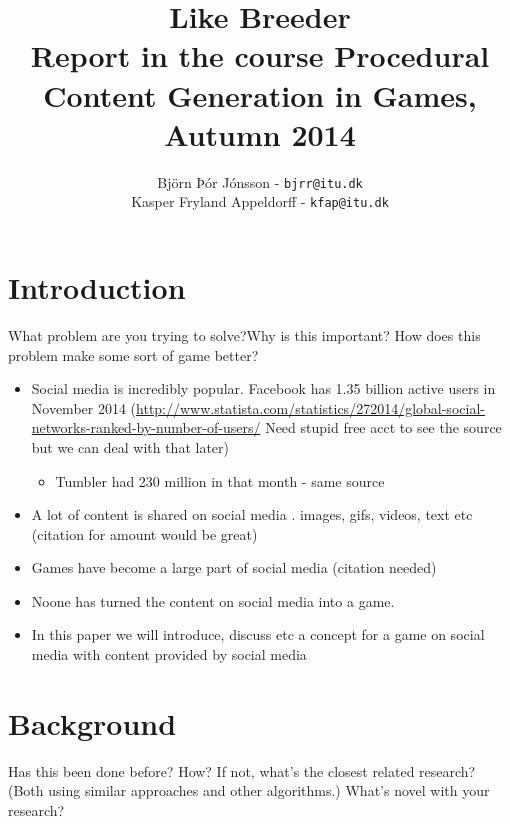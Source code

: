 \documentclass[]{article}
\title{Like Breeder\\ \small Report in the course Procedural Content Generation in Games, Autumn 2014}
\author{Björn Þór Jónsson - \texttt{bjrr@itu.dk}\\Kasper Fryland Appeldorff - \texttt{kfap@itu.dk}}
\begin{document}

\maketitle
\listoftodos %
\newpage
\begin{abstract}
\end{abstract}

\section{Introduction}
\label{sec:Introduction}
\begin{framed}
What problem are you trying to solve?Why is this important? How does this problem make some sort of game better?
\end{framed}

\begin{itemize}
\item Social media is incredibly popular. Facebook has 1.35 billion active users in November 2014 (\url{http://www.statista.com/statistics/272014/global-social-networks-ranked-by-number-of-users/} Need stupid free acct to see the source but we can deal with that later)
	\begin{itemize}
	\item Tumbler had 230 million in that month - same source
	\end{itemize}
\item A lot of content is shared on social media . images, gifs, videos, text etc (citation for amount would be great)
\item Games have become a large part of social media (citation needed)
\item Noone has turned the content on social media into a game.
\item In this paper we will introduce, discuss etc a concept for a game on social media with content provided by social media
\end{itemize}



\section{Background}
\label{sec:Background}

\begin{framed}
Has this been done before? How? If not, what’s the closest related research? (Both using similar approaches and other algorithms.) What’s novel with your research?
\end{framed}
\end{document}
